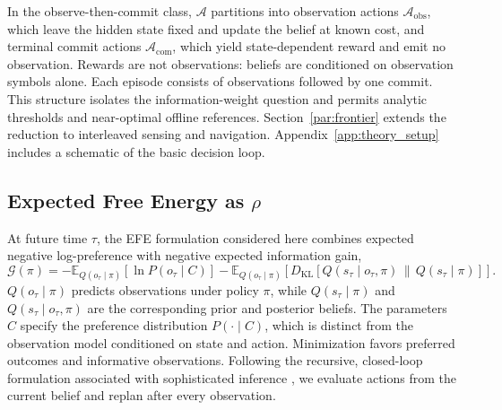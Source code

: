 \documentclass[manuscript, screen, review]{jair}
\begin{document}
In the observe-then-commit class, $\mathcal A$ partitions into observation actions $\mathcal A_{\mathrm{obs}}$, which leave the hidden state fixed and update the belief at known cost, and terminal commit actions $\mathcal A_{\mathrm{com}}$, which yield state-dependent reward and emit no observation. Rewards are not observations: beliefs are conditioned on observation symbols alone. Each episode consists of observations followed by one commit. This structure isolates the information-weight question and permits analytic thresholds and near-optimal offline references. Section~\ref{par:frontier} extends the reduction to interleaved sensing and navigation. Appendix~\ref{app:theory_setup} includes a schematic of the basic decision loop.

\subsection{Expected Free Energy as $\rho$}

At future time $\tau$, the EFE formulation considered here combines expected negative log-preference with negative expected information gain,
\begin{equation}
\mathcal G(\pi) = -\mathbb E_{Q(o_\tau\mid\pi)}[\ln P(o_\tau\mid C)]
-\mathbb E_{Q(o_\tau\mid\pi)}\!\left[D_{\mathrm{KL}}\!\left[Q(s_\tau\mid o_\tau,\pi)\,\|\,Q(s_\tau\mid\pi)\right]\right].
\end{equation}
$Q(o_\tau\mid\pi)$ predicts observations under policy $\pi$, while $Q(s_\tau\mid\pi)$ and $Q(s_\tau\mid o_\tau,\pi)$ are the corresponding prior and posterior beliefs. The parameters $C$ specify the preference distribution $P(\cdot\mid C)$, which is distinct from the observation model conditioned on state and action. Minimization favors preferred outcomes and informative observations. Following the recursive, closed-loop formulation associated with sophisticated inference \citep{friston2021,dacosta2020b}, we evaluate actions from the current belief and replan after every observation.
\end{document}
